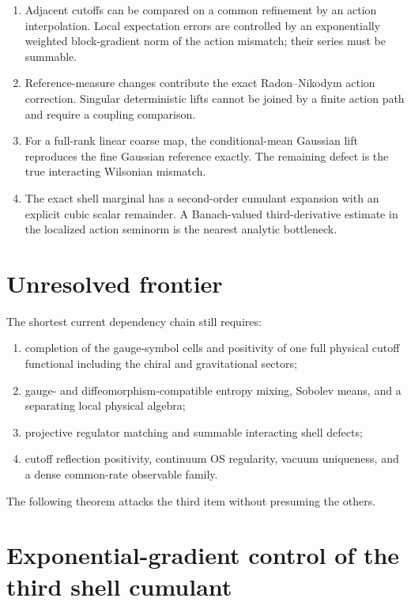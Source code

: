 \documentclass[11pt]{article}
\theoremstyle{remark}
\begin{document}
\begin{enumerate}[leftmargin=2.2em]
\item Adjacent cutoffs can be compared on a common refinement by an
      action interpolation.  Local expectation errors are controlled
      by an exponentially weighted block-gradient norm of the action
      mismatch; their series must be summable.
\item Reference-measure changes contribute the exact
      Radon--Nikodym action correction.  Singular deterministic
      lifts cannot be joined by a finite action path and require a
      coupling comparison.
\item For a full-rank linear coarse map, the conditional-mean
      Gaussian lift reproduces the fine Gaussian reference exactly.
      The remaining defect is the true interacting Wilsonian
      mismatch.
\item The exact shell marginal has a second-order cumulant expansion
      with an explicit cubic scalar remainder.  A
      Banach-valued third-derivative estimate in the localized action
      seminorm is the nearest analytic bottleneck.
\end{enumerate}

\section{Unresolved frontier}
\label{sec:v17v1-frontier}

The shortest current dependency chain still requires:
\begin{enumerate}
\item completion of the gauge-symbol cells and positivity of one full
      physical cutoff functional including the chiral and
      gravitational sectors;
\item gauge- and diffeomorphism-compatible entropy mixing, Sobolev
      means, and a separating local physical algebra;
\item projective regulator matching and summable interacting shell
      defects;
\item cutoff reflection positivity, continuum OS regularity, vacuum
      uniqueness, and a dense common-rate observable family.
\end{enumerate}
The following theorem attacks the third item without presuming the
others.

\section{Exponential-gradient control of the third shell cumulant}
\label{sec:v17v1-third-cumulant}
\end{document}
